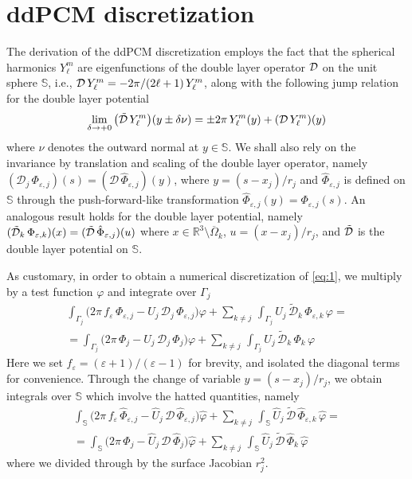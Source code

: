 \section{ddPCM discretization\label{app:pcm}}
The derivation of the ddPCM discretization employs the fact that the spherical harmonics $Y_\ell^m$ are eigenfunctions of the double layer operator $\mathcal{D}$ on the unit sphere $\mathbb{S}$, i.e., $\mathcal{D} \, Y_\ell^m =  -2\pi/ (2\ell+1) \,  Y_\ell^m$, along with the following jump relation for the double layer potential
\begin{equation}\label{eq:jump}
	\lim_{\delta \to + 0} \big(\tilde{\mathcal{D}} \, Y_\ell^m\big)(y \pm \delta \nu) =  \pm 2\pi \, Y_\ell^m(y)+ ( \mathcal{D} \, Y_\ell^m )(y)
\end{equation}
where $\nu$ denotes the outward normal at $y \in \mathbb{S}$. We shall also rely on the invariance by translation and scaling of the double layer operator, namely  $(\mathcal{D}_j \, \Phi_{\varepsilon,j})(s) = (\mathcal{D} \, \hat{\Phi}_{\varepsilon,j})(y)$, where $y = (s - x_j)/r_j$ and $\hat{\Phi}_{\varepsilon,j}$ is defined on $\mathbb{S}$ through the push-forward-like transformation $\hat{\Phi}_{\varepsilon,j}(y) = \Phi_{\varepsilon,j}(s)$. An analogous result holds for the double layer potential, namely $(\tilde{\mathcal{D}}_k \, \Phi_{\varepsilon,k} )(x) = (\tilde{\mathcal{D}} \, \hat{\Phi}_{\varepsilon,j})(u)$ where $x \in \mathbb{R}^3 \setminus \overline{\Omega}_k$, $u = (x -x_j)/ r_j$, and $\tilde{\mathcal{D}}$ is the double layer potential on $\mathbb{S}$.

As customary, in order to obtain a numerical discretization of \eqref{eq:1}, we multiply by a test function $\varphi$ and integrate over $\Gamma_j$
\begin{multline*}
\int_{\Gamma_j}\big( 2\pi \, f_\varepsilon \, \Phi_{\varepsilon,j} - U_j \, {\mathcal{D}}_j \, \Phi_{\varepsilon,j} \big) \varphi +  \sum_{k \ne j} \, \int_{\Gamma_j} U_j \, \tilde{\mathcal{D}}_{k} \, \Phi_{\varepsilon,k} \, \varphi  = \\ 
= \int_{\Gamma_j}\big( 2 \pi \, {\Phi_j} - U_j \, {\mathcal{D}}_j \,\Phi_{j} \big) \varphi + \sum_{k \ne j} \,\int_{\Gamma_j } U_j \,  \tilde{\mathcal{D}}_{k} \, \Phi_{k}  \, \varphi
\end{multline*}
Here we set $f_\varepsilon = (\varepsilon + 1)/(\varepsilon - 1)$ for brevity, and isolated the diagonal terms for convenience.  Through the change of variable $y = (s- x_j)/r_j$, we obtain integrals over $\mathbb{S}$ which involve the hatted quantities, namely
\begin{multline}\label{eq:73}
 \int_{\mathbb{S}}\big( 2\pi \, f_\varepsilon \, \hat{\Phi}_{\varepsilon,j} - \hat{U}_j \, {\mathcal{D}} \, \hat{\Phi}_{\varepsilon,j} \big) \hat{\varphi} + \sum_{k \ne j} \,\int_{\mathbb{S}}  \hat{U}_j \, \tilde{\mathcal{D}} \, \hat{\Phi}_{\varepsilon,k} \, \hat{\varphi}  = \\ 
= \int_{\mathbb{S}}\big( 2 \pi \, \hat{\Phi}_j - \hat{U}_j \, {\mathcal{D}} \,\hat{\Phi}_j \big) \hat{\varphi} + \sum_{k \ne j} \, \int_{\mathbb{S}}  \hat{U}_j \, \tilde{\mathcal{D}} \, \hat{\Phi}_{k}  \, \hat{\varphi}
\end{multline}
where we divided through by the surface Jacobian $r_j^2$.

